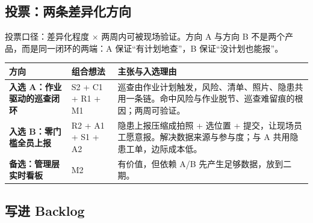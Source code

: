 \documentclass[11pt,a4paper,twoside,fontset=fandol]{ctexart}
\begin{document}
\subsection{投票：两条差异化方向}

投票口径：差异化程度 $\times$ 两周内可被现场验证。方向 A 与方向 B 不是两个产品，而是同一闭环的两端：A 保证“有计划地查”，B 保证“没计划也能报”。

\begin{table}[H]
\centering
\scriptsize
\renewcommand{\arraystretch}{1.05}
\begin{tabularx}{\linewidth}{@{}>{\raggedright\arraybackslash}p{31mm}>{\raggedright\arraybackslash}p{27mm}X@{}}
\toprule
\textbf{方向} & \textbf{组合想法} & \textbf{主张与入选理由} \\
\midrule
\textbf{入选 A：作业驱动的巡查闭环} & S2 + C1 + R1 + M1 & 巡查由作业计划触发，风险、清单、照片、隐患共用一条链。命中风险与作业脱节、巡查难留痕的根因；两周可验证。 \\
\textbf{入选 B：零门槛全员上报} & R2 + A1 + S1 + A2 & 隐患上报压缩成拍照 + 选位置 + 提交，让现场员工愿意报。解决数据来源与参与度；与 A 共用隐患工单，边际成本低。 \\
\textbf{备选：管理层实时看板} & M2 & 有价值，但依赖 A/B 先产生足够数据，放到二期。 \\
\bottomrule
\end{tabularx}
\end{table}

\subsection{写进 Backlog}
\end{document}
